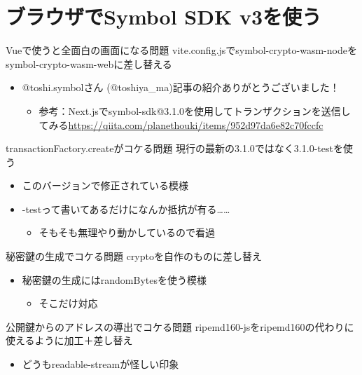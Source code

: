 \section{ブラウザでSymbol SDK v3を使う}

\begin{frame}{Vueで使うと全面白の画面になる問題}
	vite.config.jsでsymbol-crypto-wasm-nodeをsymbol-crypto-wasm-webに差し替える
	\begin{itemize}
		\item {} @toshi.symbolさん (@toshiya\_ma)記事の紹介ありがとうございました！
		\begin{itemize}
			\item 参考：Next.jsでsymbol-sdk@3.1.0を使用してトランザクションを送信してみる\url{https://qiita.com/planethouki/items/952d97da6e82c70fccfc}
		\end{itemize}
	\end{itemize}
\end{frame}

\begin{frame}{transactionFactory.createがコケる問題}
	現行の最新の3.1.0ではなく3.1.0-testを使う
	\begin{itemize}
		\item このバージョンで修正されている模様
		\item -testって書いてあるだけになんか抵抗が有る……
		\begin{itemize}
			\item そもそも無理やり動かしているので看過
		\end{itemize}
	\end{itemize}
\end{frame}

\begin{frame}{秘密鍵の生成でコケる問題}
	cryptoを自作のものに差し替え
	\begin{itemize}
		\item 秘密鍵の生成にはrandomBytesを使う模様
		\begin{itemize}
			\item そこだけ対応
		\end{itemize}
	\end{itemize}
\end{frame}

\begin{frame}{公開鍵からのアドレスの導出でコケる問題}
	ripemd160-jsをripemd160の代わりに使えるように加工＋差し替え
	\begin{itemize}
		\item どうもreadable-streamが怪しい印象
	\end{itemize}
\end{frame}
